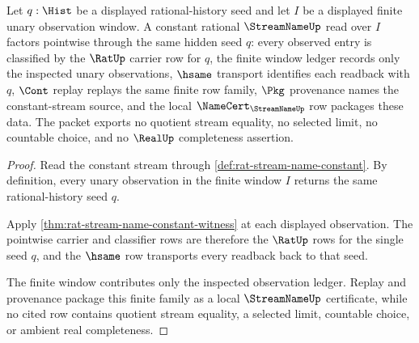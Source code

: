 \begin{theorem}
\label{thm:streamname-constant-window}
Let $q:\Hist$ be a displayed rational-history seed and let $I$ be a displayed finite unary observation window. A constant rational $\StreamNameUp$ read over $I$ factors pointwise through the same hidden seed $q$: every observed entry is classified by the $\RatUp$ carrier row for $q$, the finite window ledger records only the inspected unary observations, $\hsame$ transport identifies each readback with $q$, $\Cont$ replay replays the same finite row family, $\Pkg$ provenance names the constant-stream source, and the local $\NameCert_{\StreamNameUp}$ row packages these data. The packet exports no quotient stream equality, no selected limit, no countable choice, and no $\RealUp$ completeness assertion.
\end{theorem}
\begin{proof}
Read the constant stream through \autoref{def:rat-stream-name-constant}. By definition, every unary observation in the finite window $I$ returns the same rational-history seed $q$.

Apply \autoref{thm:rat-stream-name-constant-witness} at each displayed observation. The pointwise carrier and classifier rows are therefore the $\RatUp$ rows for the single seed $q$, and the $\hsame$ row transports every readback back to that seed.

The finite window contributes only the inspected observation ledger. Replay and provenance package this finite family as a local $\StreamNameUp$ certificate, while no cited row contains quotient stream equality, a selected limit, countable choice, or ambient real completeness.
\end{proof}
